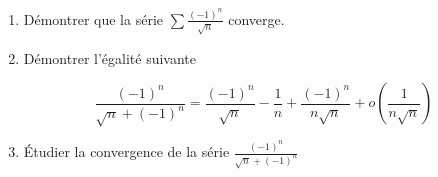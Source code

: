 \begin{enumerate}
    \item Démontrer que la série $\displaystyle \sum \frac{(-1)^n}{\sqrt{n}}$ converge.
    \item Démontrer l'égalité suivante

    $$
        \frac{(-1)^n}{\sqrt{n} + (-1)^n} = \frac{(-1)^n }{\sqrt{n}} - \frac{1}{n} + \frac{(-1)^n}{n\sqrt{n}} + o(\frac{1}{n\sqrt{n}})
    $$

    \item Étudier la convergence de la série $\displaystyle \frac{(-1)^n}{\sqrt{n} + (-1)^n}$
\end{enumerate}